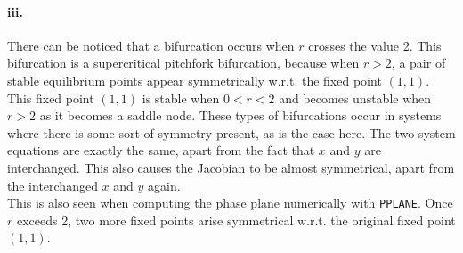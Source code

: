 \documentclass[a4paper,11pt]{article}
\begin{document}
\paragraph{iii.}\: There can be noticed that a bifurcation occurs when $r$ crosses the value 2. This bifurcation is a 
supercritical pitchfork bifurcation, because when $r>2$, a pair of stable equilibrium points appear symmetrically w.r.t. the fixed point $(1,1)$.
This fixed point $(1,1)$ is stable when $0<r<2$ and becomes unstable when $r>2$ as it becomes a saddle node.
These types of bifurcations occur in systems where there is some sort of symmetry present, as is the case here.
The two system equations are exactly the same, apart from the fact that $x$ and $y$ are interchanged. This also causes the 
Jacobian to be almost symmetrical, apart from the interchanged $x$ and $y$ again.\\
This is also seen when computing the phase plane numerically with \texttt{PPLANE}. Once $r$ exceeds 2, 
two more fixed points arise symmetrical w.r.t. the original fixed point $(1,1)$.
\end{document}
